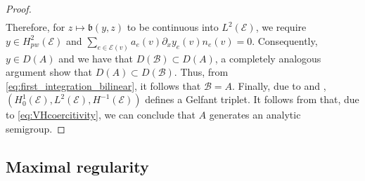\documentclass[10pt,a4paper]{amsart}
\begin{document}
\begin{proof}
\begin{align*}
\end{align*}
Therefore, for $z\mapsto \mathfrak{b}(y,z) $ to be continuous into $L^2(\mathcal{E})$, we require $y\in H^2_{pw}(\mathcal{E})$ and $\sum_{e\in\mathcal{E}(v)}a_e(v)\partial_x y_e(v)n_e(v)=0.$ Consequently, $y\in D(A)$ and we have that $D(\mathfrak{\mathcal{B}})\subset D(A)$, a completely analogous argument show that $D(A) \subset D(\mathfrak{\mathcal{B}})$. Thus, from \eqref{eq:first_integration_bilinear}, it follows that $\mathfrak{\mathcal{B}}=A$. Finally, due to and  ,  $(H_0^1(\mathcal{E}),L^2(\mathcal{E}),H^{-1}(\mathcal{E}))$ defines a Gelfant triplet. It follows from \cite[Theorem 2.12]{Bensoussan} that, due to \eqref{eq:VHcoercitivity}, we can conclude that $A$ generates an analytic semigroup.
\end{proof}


\subsection{Maximal regularity}
\end{document}
